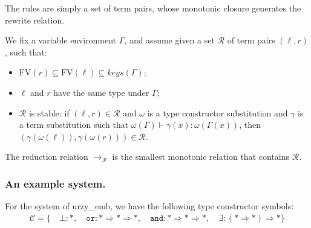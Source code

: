 \documentclass[runningheads,a4paper]{llncs}
\newcommand{\Rules}{\mathcal{R}}
\newcommand{\TypeConstructors}{\mathcal{C}}
\newcommand{\arr}[1]{\longrightarrow_{#1}}
\newcommand{\arrkind}{\Rightarrow}
\newcommand{\FV}{\mathrm{FV}}
\newcommand{\proves}{\vdash}
\begin{document}
The rules are simply a set of term pairs, whose monotonic closure
generates the rewrite relation.

\begin{definition}\normalfont
We fix a variable environment $\Gamma$, and assume given a set
$\Rules$ of term pairs $(\ell,r)$, such that:
\begin{itemize}
\item $\FV(r) \subseteq \FV(\ell) \subseteq \mathit{keys}(\Gamma)$;
\item $\ell$ and $r$ have the same type under $\Gamma$;
\item $\Rules$ is stable: if $(\ell,r) \in \Rules$ and $\omega$ is a
  type constructor substitution and $\gamma$ is a term substitution
  such that $\omega(\Gamma) \proves \gamma(x) : \omega(\Gamma(x))$,
  then $(\gamma(\omega(\ell)),\gamma(\omega(r))) \in \Rules$.
\end{itemize}
The reduction relation $\arr{\Rules}$ is the smallest monotonic
relation that contains $\Rules$.
\end{definition}

\subsubsection{An example system.}

For the system of urzy\_emb, we have the following type constructor
symbols:
\[
\begin{array}{c}
\TypeConstructors = \{\quad
  \bot : *,\quad
  \mathtt{or} : * \arrkind * \arrkind *,\quad
  \mathtt{and} : * \arrkind * \arrkind *,\quad
  \exists : (* \arrkind *) \arrkind *
  \}
\end{array}
\]
\end{document}
